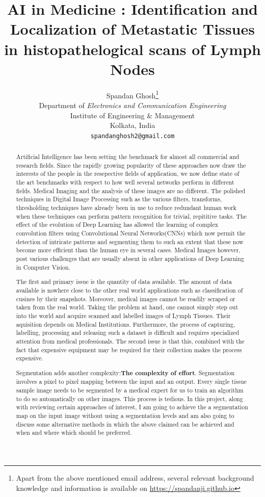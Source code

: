\documentclass[19pt]{article}
\title{AI in Medicine : Identification and Localization of Metastatic Tissues in histopathelogical scans of Lymph Nodes}
\author{
    Spandan Ghosh\thanks{Apart from the above mentioned email address, several relevant background knowledge and information is available on \url{https://spandanji.github.io}}\\
    Department of \emph{Electronics and Communication Engineering}\\
  Institute of Engineering \& Management\\
  Kolkata, India \\
  \texttt{spandanghosh2@gmail.com} \\
}
\begin{document}
\maketitle

\begin{abstract}
    Artificial Intelligence has been setting the benchmark for almost all commercial and research fields. Since the rapidly growing popularity of these approaches now draw the interests of the people in the resepective fields of application, we now define state of the art benchmarks with respect to how well several networks perform in different fields. Medical Imaging and the analysis of these images are no different. The polished techniques in Digital Image Processing such as the various filters, transforms, thresholding techniques have already been in use to reduce redundant human work when these techniques can perform pattern recognition for trivial, repititive tasks. The effect of the evolution of Deep Learning has allowed the learning of complex convolution filters using Convolutional Neural Networks(CNNs) which now permit the detection of intricate patterns and segmenting them to such an extent that these now become more efficient than the human eye in several cases. Medical Images however, post various challenges that are usually absent in other applications of Deep Learning in Computer Vision. 

    The first and primary issue is the quantity of data available. The amount of data available is nowhere close to the other real world applications such as classification of cusines by their snapshots. Moreover, medical images cannot be readily scraped or taken from the real world. Taking the problem at hand, one cannot simply step out into the world and acquire scanned and labelled images of Lymph Tissues. Their aquisition depends on Medical Institutions. Furthermore, the process of capturing, labelling, processing and releasing such a dataset is difficult and requires specialized attention from medical professionals. The second issue is that this, combined with the fact that expensive equipment may be required for their collection makes the process expensive.

    Segmentation adds another complexity:\textbf{The complexity of effort}. Segmentation involves a pixel to pixel mapping between the input and an output. Every single tissue sample image needs to be segmented by a medical expert for us to train an algorithm to do so automatically on other images. This process is tedious. In this project, along with reviewing certain approaches of interest, I am going to achieve the a segmentation map on the input image without using a segmentation levels and am also going to discuss some alternative methods in which the above claimed can be achieved and when and where which should be preferred.
    
\end{abstract}
\newpage
    \tableofcontents
\newpage
\end{document}
